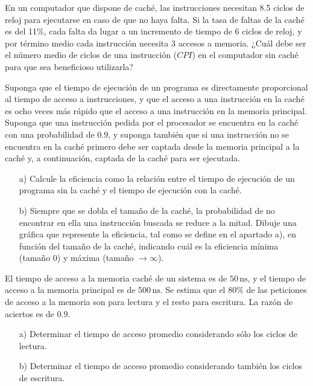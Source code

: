 \begin{ejercicio}
    En un computador que dispone de caché, las instrucciones necesitan 8.5 ciclos de reloj para ejecutarse en caso de que no haya falta. Si la tasa de faltas de la caché es del 11\%, cada falta da lugar a un incremento de tiempo de 6 ciclos de reloj, y por término medio cada instrucción necesita 3 accesos a memoria. ¿Cuál debe ser el número medio de ciclos de una instrucción (\(CPI\)) en el computador sin caché para que sea beneficioso utilizarla?
\end{ejercicio}

\begin{ejercicio}
    Suponga que el tiempo de ejecución de un programa es directamente proporcional al tiempo de acceso a instrucciones, y que el acceso a una instrucción en la caché es ocho veces más rápido que el acceso a una instrucción en la memoria principal. Suponga que una instrucción pedida por el procesador se encuentra en la caché con una probabilidad de \(0.9\), y suponga también que si una instrucción no se encuentra en la caché primero debe ser captada desde la memoria principal a la caché y, a continuación, captada de la caché para ser ejecutada.
    \begin{itemize}
        \item[a)] Calcule la eficiencia como la relación entre el tiempo de ejecución de un programa sin la caché y el tiempo de ejecución con la caché.
        \item[b)] Siempre que se dobla el tamaño de la caché, la probabilidad de no encontrar en ella una instrucción buscada se reduce a la mitad. Dibuje una gráfica que represente la eficiencia, tal como se define en el apartado a), en función del tamaño de la caché, indicando cuál es la eficiencia mínima (tamaño \(0\)) y máxima (tamaño \(\to \infty\)).
    \end{itemize}
\end{ejercicio}

\begin{ejercicio}
    El tiempo de acceso a la memoria caché de un sistema es de \(50 \, \text{ns}\), y el tiempo de acceso a la memoria principal es de \(500 \, \text{ns}\). Se estima que el \(80\%\) de las peticiones de acceso a la memoria son para lectura y el resto para escritura. La razón de aciertos es de \(0.9\).
    \begin{itemize}
        \item[a)] Determinar el tiempo de acceso promedio considerando sólo los ciclos de lectura.
        \item[b)] Determinar el tiempo de acceso promedio considerando también los ciclos de escritura.
    \end{itemize}
\end{ejercicio}

